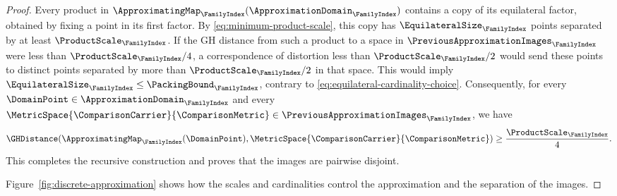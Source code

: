 \begin{proof}
Every product in
$\ApproximatingMap_{\FamilyIndex}(\ApproximationDomain_{\FamilyIndex})$
contains a copy of its equilateral factor,
obtained by fixing a point in its first factor.
By \eqref{eq:minimum-product-scale},
this copy has
$\EquilateralSize_{\FamilyIndex}$
points separated by at least
$\ProductScale_{\FamilyIndex}$.
If the GH distance from such a product to a space in
$\PreviousApproximationImages_{\FamilyIndex}$
were less than
$\ProductScale_{\FamilyIndex}/4$,
a correspondence of distortion less than
$\ProductScale_{\FamilyIndex}/2$
would send these points to distinct points separated by more than
$\ProductScale_{\FamilyIndex}/2$
in that space.
This would imply
$\EquilateralSize_{\FamilyIndex}\leq\PackingBound_{\FamilyIndex}$,
contrary to \eqref{eq:equilateral-cardinality-choice}.
Consequently,
for every
$\DomainPoint\in\ApproximationDomain_{\FamilyIndex}$
and every
$\MetricSpace{\ComparisonCarrier}{\ComparisonMetric}\in\PreviousApproximationImages_{\FamilyIndex}$,
we have
\begin{equation}\label{eq:recursive-image-separation}
 \GHDistance(\ApproximatingMap_{\FamilyIndex}(\DomainPoint),
             \MetricSpace{\ComparisonCarrier}{\ComparisonMetric})
 \geq\frac{\ProductScale_{\FamilyIndex}}4.
\end{equation}
This completes the recursive construction and proves that the images are pairwise disjoint.

Figure~\ref{fig:discrete-approximation} shows how the scales and cardinalities
control the approximation and the separation of the images.



\end{proof}
